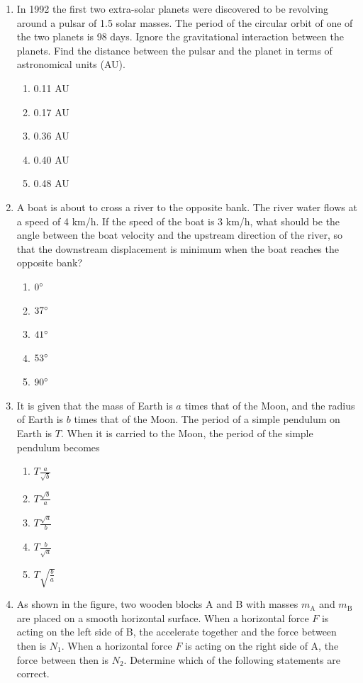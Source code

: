 \documentclass[12pt,letterpaper]{article}
\begin{document}
\begin{enumerate}[resume]
\item
In 1992 the first two extra-solar planets were discovered to be revolving around a pulsar of 1.5 solar masses. The period of the circular orbit of one of the two planets is 98 days. Ignore the gravitational interaction between the planets. Find the distance between the pulsar and the planet in terms of astronomical units (AU).
\begin{enumerate}
\item 0.11 AU
\item 0.17 AU
\item 0.36 AU
\item 0.40 AU
\item 0.48 AU
\end{enumerate}

\vfill
\newpage

\item
A boat is about to cross a river to the opposite bank. The river water flows at a speed of 4 km/h. If the speed of the boat is 3 km/h, what should be the angle between the boat velocity and the upstream direction of the river, so that the downstream displacement is minimum when the boat reaches the opposite bank?
\begin{enumerate}
\item $0\degree$
\item $37\degree$
\item $41\degree$
\item $53\degree$
\item $90\degree$
\end{enumerate}

\item
It is given that the mass of Earth is $a$ times that of the Moon, and the radius of Earth is $b$ times that of the Moon. The period of a simple pendulum on Earth is $T$. When it is carried to the Moon, the period of the simple pendulum becomes
\begin{enumerate}
\item $\displaystyle T\frac{a}{\sqrt{b}}$
\item $\displaystyle T\frac{\sqrt{b}}{a}$
\item $\displaystyle T\frac{\sqrt{a}}{b}$
\item $\displaystyle T\frac{b}{\sqrt{a}}$
\item $\displaystyle T\sqrt{\frac{b}{a}}$
\end{enumerate}

\item
As shown in the figure, two wooden blocks A and B with masses $m_\text{A}$ and $m_\text{B}$ are placed on a smooth horizontal surface. When a horizontal force $F$ is acting on the left side of B, the accelerate together and the force between then is $N_1$. When a horizontal force $F$ is acting on the right side of A, the force between then is $N_2$. Determine which of the following statements are correct.


\end{enumerate}
\end{document}
